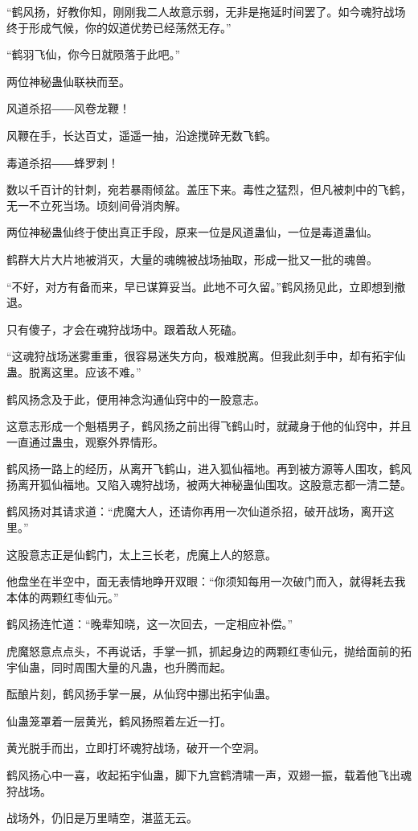 \begin{this_body}
“鹤风扬，好教你知，刚刚我二人故意示弱，无非是拖延时间罢了。如今魂狩战场终于形成气候，你的奴道优势已经荡然无存。”

“鹤羽飞仙，你今日就陨落于此吧。”

两位神秘蛊仙联袂而至。

风道杀招――风卷龙鞭！

风鞭在手，长达百丈，遥遥一抽，沿途搅碎无数飞鹤。

毒道杀招――蜂罗刺！

数以千百计的针刺，宛若暴雨倾盆。盖压下来。毒性之猛烈，但凡被刺中的飞鹤，无一不立死当场。顷刻间骨消肉解。

两位神秘蛊仙终于使出真正手段，原来一位是风道蛊仙，一位是毒道蛊仙。

鹤群大片大片地被消灭，大量的魂魄被战场抽取，形成一批又一批的魂兽。

“不好，对方有备而来，早已谋算妥当。此地不可久留。”鹤风扬见此，立即想到撤退。

只有傻子，才会在魂狩战场中。跟着敌人死磕。

“这魂狩战场迷雾重重，很容易迷失方向，极难脱离。但我此刻手中，却有拓宇仙蛊。脱离这里。应该不难。”

鹤风扬念及于此，便用神念沟通仙窍中的一股意志。

这意志形成一个魁梧男子，鹤风扬之前出得飞鹤山时，就藏身于他的仙窍中，并且一直通过蛊虫，观察外界情形。

鹤风扬一路上的经历，从离开飞鹤山，进入狐仙福地。再到被方源等人围攻，鹤风扬离开狐仙福地。又陷入魂狩战场，被两大神秘蛊仙围攻。这股意志都一清二楚。

鹤风扬对其请求道：“虎魔大人，还请你再用一次仙道杀招，破开战场，离开这里。”

这股意志正是仙鹤门，太上三长老，虎魔上人的怒意。

他盘坐在半空中，面无表情地睁开双眼：“你须知每用一次破门而入，就得耗去我本体的两颗红枣仙元。”

鹤风扬连忙道：“晚辈知晓，这一次回去，一定相应补偿。”

虎魔怒意点点头，不再说话，手掌一抓，抓起身边的两颗红枣仙元，抛给面前的拓宇仙蛊，同时周围大量的凡蛊，也升腾而起。

酝酿片刻，鹤风扬手掌一展，从仙窍中挪出拓宇仙蛊。

仙蛊笼罩着一层黄光，鹤风扬照着左近一打。

黄光脱手而出，立即打坏魂狩战场，破开一个空洞。

鹤风扬心中一喜，收起拓宇仙蛊，脚下九宫鹤清啸一声，双翅一振，载着他飞出魂狩战场。

战场外，仍旧是万里晴空，湛蓝无云。


\end{this_body}
